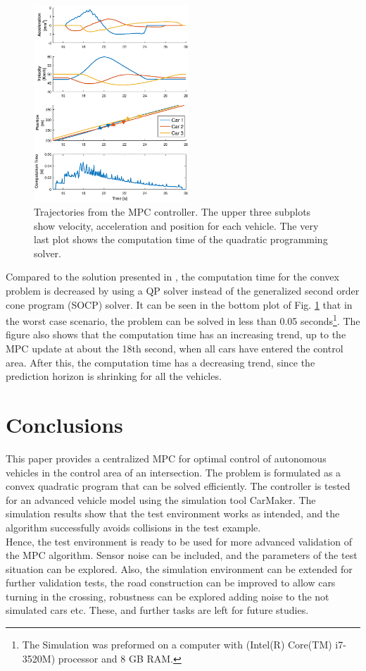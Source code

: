 \documentclass[letterpaper,10pt,conference]{ieeeconf}
\begin{document}
\begin{figure}[ht!]
    \centering
    \includegraphics[width=0.52\textwidth]{New_Result_ds4.eps}
    \caption{Trajectories from the MPC controller. The upper three subplots show velocity, acceleration and position for each vehicle. The very last plot shows the computation time of the quadratic programming solver.}
    \label{fig:sim_results}
\end{figure}

Compared to the solution presented in \cite{nikolce}, the computation time for the convex problem is decreased by using a QP solver instead of the generalized second order cone program (SOCP) solver. It can be seen in the bottom plot of Fig. \ref{fig:sim_results} that in the worst case scenario, the problem can be solved in less than 0.05 seconds\footnote{The Simulation was preformed on a computer with (Intel(R) Core(TM) i7-3520M) processor and 8 GB RAM.}. The figure also shows that the computation time has an increasing trend, up to the MPC update at about the 18th second, when all cars have entered the control area. After this, the computation time has a decreasing trend, since the prediction horizon is shrinking for all the vehicles.

\section{Conclusions} \label{sec:conclusions}
This paper provides a centralized MPC for optimal control of
autonomous vehicles in the control area of an intersection. The
problem is formulated as a convex quadratic program that can be solved
efficiently. The controller is tested for an advanced vehicle model
using the simulation tool CarMaker. The simulation results show
that the test environment works as intended, and the algorithm
successfully avoids collisions in the test example.\\ \indent
Hence, the test environment is ready to be used for more advanced
validation of the MPC algorithm. Sensor  noise can be included, and
the parameters of the test situation can be explored. Also, the
simulation environment can be extended for further validation tests,
the road construction can be improved to allow cars turning in the
crossing, robustness can be explored adding noise to the not simulated
cars etc. These, and further tasks are left for future studies.
\end{document}
